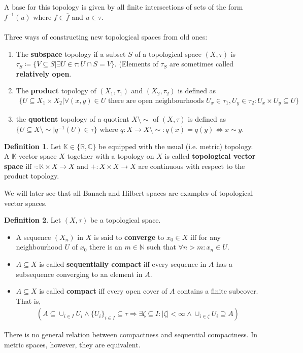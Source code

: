 \documentclass[10pt,a4paper]{article}
\theoremstyle{definition}
\newtheorem{definition}{Definition}
\theoremstyle{cor}
\theoremstyle{theorem}
\theoremstyle{lemma}
\theoremstyle{example}
\theoremstyle{remark}
\begin{document}
\\\\
A base for this topology is given by all finite intersections of sets of the form $f^{-1}(u)$ where $f\in\overline{f}$ and $u\in\tau$.
\\\\
Three ways of constructing new topological spaces from old ones:
\begin{enumerate}
\item The \textbf{subspace} topology if a subset $S$ of a topological space $(X, \tau)$ is $\tau_S \coloneqq \{ V\subseteq S | \exists U \in \tau : U \cap S = V\}$. (Elements  of $\tau_S$ are sometimes called \textbf{relatively open}.
\item The \textbf{product} topology of $(X_1, \tau_1)$ and $(X_2, \tau_2)$ is defined as
\begin{align*}
 \{ U \subseteq X_1 \times X_2 | \forall(x, y)\in U \text{ there are open neighbourhoods } U_x \in \tau_1, U_y \in \tau_2 : U_x \times U_y \subseteq U \}
\end{align*}
\item the \textbf{quotient} topology of a quotient $X \setminus \sim$ of $(X, \tau)$ is defined as $\{ U \subseteq X \setminus \sim  | q^{-1}(U) \in \tau \}$ where $q:X \rightarrow X\setminus \sim : q(x) = q(y) \Leftrightarrow x \sim y$.
\end{enumerate}
\begin{definition}
Let $\mathbb{K}\in\{\mathbb{R}, \mathbb{C}\}$ be equipped with the usual (i.e. metric) topology. A $\mathbb{K}$-vector space $X$ together with a topology on $X$ is called \textbf{topological vector space} iff $\cdot : \mathbb{K} \times X \rightarrow X$ and $+ : X\times X \rightarrow X$ are continuous with respect to the product topology. 
\end{definition}

\noindent We will later see that all Banach and Hilbert spaces are examples of topological vector spaces.

\begin{definition}
Let $(X,\tau)$ be a topological space.
\begin{itemize}
\item A sequence $(X_n)$ in $X$ is said to \textbf{converge} to $x_0\in X$ iff for any neighbourhood $U$ of $x_0$ there is an $m\in \mathbb{N}$ such that  $\forall n > m : x_n \in U$.
\item $A \subseteq X$ is called \textbf{sequentially compact} iff every sequence in $A$ has a subsequence converging to an element in $A$.
\item $A \subseteq X $ is called \textbf{compact} iff every open cover of $A$ contains a finite subcover. That is, 
\begin{align*}
\left(A \subseteq \cup_{i \in I} U_i \wedge \{U_i\}_{i\in I} \subseteq \tau \Rightarrow \exists \zeta \subseteq I : |\zeta| < \infty \wedge \cup_{i\in \zeta} U_{i} \supseteq A\right)
\end{align*}
\end{itemize}
\end{definition}
\noindent There is no general relation between compactness and sequential compactness. In metric spaces, however, they are equivalent. 
\end{document}
